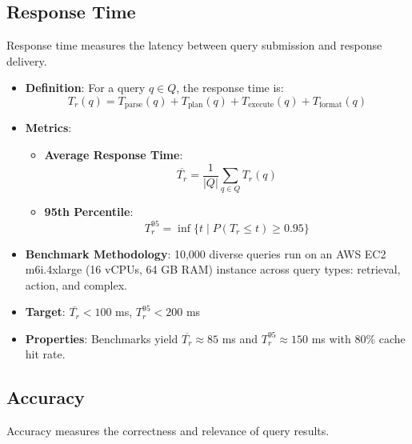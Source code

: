 \documentclass[11pt]{article}
\begin{document}
\subsection{Response Time}
\label{subsec:response_time}

Response time measures the latency between query submission and response delivery.

\begin{itemize}
    \item \textbf{Definition}: For a query $q \in Q$, the response time is:
        \[
        T_r(q) = T_{\text{parse}}(q) + T_{\text{plan}}(q) + T_{\text{execute}}(q) + T_{\text{format}}(q)
        \]

    \item \textbf{Metrics}:
        \begin{itemize}
            \item \textbf{Average Response Time}:
                \[
                \overline{T_r} = \frac{1}{|Q|} \sum_{q \in Q} T_r(q)
                \]
            \item \textbf{95th Percentile}:
                \[
                T_r^{95} = \inf \{ t \mid P(T_r \leq t) \geq 0.95 \}
                \]
        \end{itemize}

    \item \textbf{Benchmark Methodology}: 10,000 diverse queries run on an AWS EC2 m6i.4xlarge (16 vCPUs, 64 GB RAM) instance across query types: retrieval, action, and complex.

    \item \textbf{Target}: $\overline{T_r} < 100$ ms, $T_r^{95} < 200$ ms

    \item \textbf{Properties}: Benchmarks yield $\overline{T_r} \approx 85$ ms and $T_r^{95} \approx 150$ ms with 80\% cache hit rate.
\end{itemize}

\subsection{Accuracy}
\label{subsec:accuracy}

Accuracy measures the correctness and relevance of query results.
\end{document}
